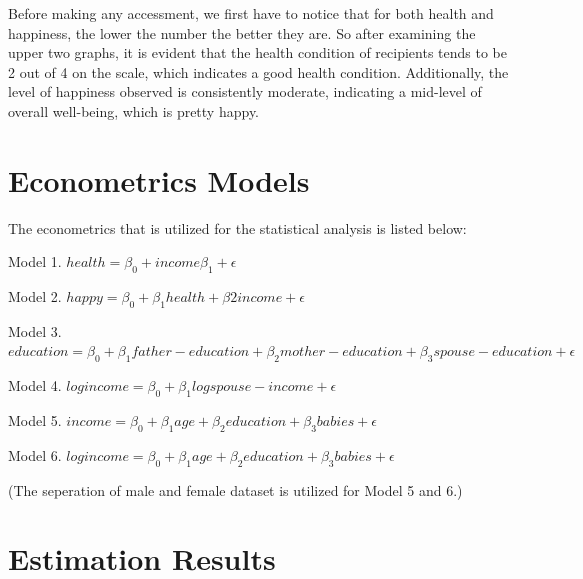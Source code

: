 \documentclass{article}[13pt]
\begin{document}
Before making any accessment, we first have to notice that for both health and happiness, the
lower the number the better they are. So after examining the upper two graphs, it is evident that the health condition of recipients 
tends to be 2 out of 4 on the scale, which indicates a good health condition. Additionally, 
the level of happiness observed is consistently moderate, indicating a mid-level of overall well-being, 
which is pretty happy.

\section{Econometrics Models}
The econometrics that is utilized for the statistical analysis is listed below:

Model 1. $health = \beta_0 + income\beta_1 + \epsilon$

Model 2. $happy = \beta_0 + \beta_1health + \beta2income + \epsilon$

Model 3. $education = \beta_0 + \beta_1father-education + \beta_2mother-education + \beta_3spouse-education + \epsilon$

Model 4. $logincome = \beta_0 + \beta_1logspouse-income + \epsilon$

Model 5. $income = \beta_0 + \beta_1age + \beta_2education + \beta_3babies + \epsilon$

Model 6. $logincome = \beta_0 + \beta_1age + \beta_2education + \beta_3babies + \epsilon$

(The seperation of male and female dataset is utilized for Model 5 and 6.)
\newpage

\section{Estimation Results}
\end{document}
